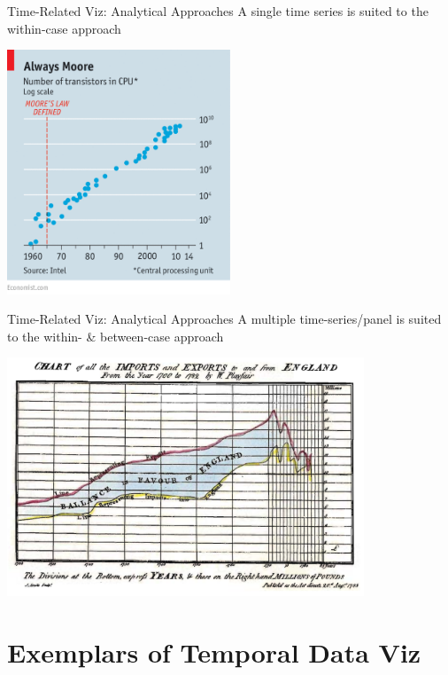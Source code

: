 \documentclass[notes, aspectratio=1610]{beamer}
\begin{document}
\begin{frame}{Time-Related Viz: Analytical Approaches}
	{A single time series is suited to the within-case approach}

	\centering

	\includegraphics[width=0.5\textwidth]{images/20150418_WBC823_0.png}

\end{frame}

\begin{frame}{Time-Related Viz: Analytical Approaches}
	{A multiple time-series/panel is suited to the within- \& 
	between-case approach}

	\centering

	\includegraphics[width=0.8\textwidth]{images/import_export.png}

\end{frame}

\section{Exemplars of Temporal Data Viz}
\end{document}
